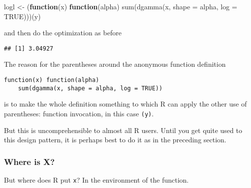 \documentclass[
]{article}
\newenvironment{Shaded}{\begin{snugshade}}{\end{snugshade}}
\newcommand{\AttributeTok}[1]{\textcolor[rgb]{0.77,0.63,0.00}{#1}}
\newcommand{\ConstantTok}[1]{\textcolor[rgb]{0.00,0.00,0.00}{#1}}
\newcommand{\ControlFlowTok}[1]{\textcolor[rgb]{0.13,0.29,0.53}{\textbf{#1}}}
\newcommand{\FunctionTok}[1]{\textcolor[rgb]{0.00,0.00,0.00}{#1}}
\newcommand{\NormalTok}[1]{#1}
\newcommand{\OtherTok}[1]{\textcolor[rgb]{0.56,0.35,0.01}{#1}}
\newcommand{\SpecialCharTok}[1]{\textcolor[rgb]{0.00,0.00,0.00}{#1}}
\begin{document}
\begin{Shaded}
\begin{Highlighting}[]
\NormalTok{logl }\OtherTok{\textless{}{-}}\NormalTok{ (}\ControlFlowTok{function}\NormalTok{(x) }\ControlFlowTok{function}\NormalTok{(alpha)}
    \FunctionTok{sum}\NormalTok{(}\FunctionTok{dgamma}\NormalTok{(x, }\AttributeTok{shape =}\NormalTok{ alpha, }\AttributeTok{log =} \ConstantTok{TRUE}\NormalTok{)))(y)}
\end{Highlighting}
\end{Shaded}

and then do the optimization as before

\begin{Shaded}
\end{Shaded}

\begin{verbatim}
## [1] 3.04927
\end{verbatim}

The reason for the parentheses around the anonymous function definition

\begin{verbatim}
function(x) function(alpha)
    sum(dgamma(x, shape = alpha, log = TRUE))
\end{verbatim}

is to make the whole definition something to which R can apply the other
use of parentheses: function invocation, in this case \texttt{(y)}.

But this is uncomprehensible to almost all R users. Until you get quite
used to this design pattern, it is perhaps best to do it as in the
preceding section.

\hypertarget{where-is-x}{%
\subsubsection{Where is X?}\label{where-is-x}}

But where does R put \texttt{x}? In the environment of the function.

\begin{Shaded}
\end{Shaded}
\end{document}
